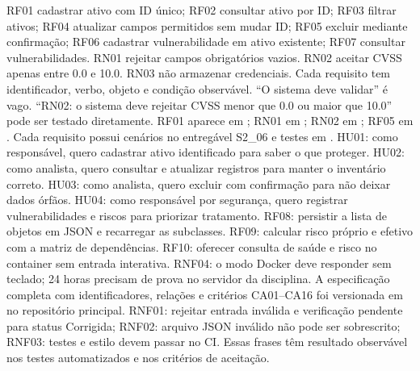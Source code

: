 
 RF01 cadastrar ativo com ID único; RF02 consultar ativo por ID; RF03 filtrar ativos; RF04 atualizar campos permitidos sem mudar ID; RF05 excluir mediante confirmação; RF06 cadastrar vulnerabilidade em ativo existente; RF07 consultar vulnerabilidades. RN01 rejeitar campos obrigatórios vazios. RN02 aceitar CVSS apenas entre 0.0 e 10.0. RN03 não armazenar credenciais.
 Cada requisito tem identificador, verbo, objeto e condição observável. ``O sistema deve validar'' é vago. ``RN02: o sistema deve rejeitar CVSS menor que 0.0 ou maior que 10.0'' pode ser testado diretamente.
 RF01 aparece em ; RN01 em ; RN02 em ; RF05 em . Cada requisito possui cenários no entregável S2\_06 e testes em .
 HU01: como responsável, quero cadastrar ativo identificado para saber o que proteger. HU02: como analista, quero consultar e atualizar registros para manter o inventário correto. HU03: como analista, quero excluir com confirmação para não deixar dados órfãos. HU04: como responsável por segurança, quero registrar vulnerabilidades e riscos para priorizar tratamento.
 RF08: persistir a lista de objetos em JSON e recarregar as subclasses. RF09: calcular risco próprio e efetivo com a matriz de dependências. RF10: oferecer consulta de saúde e risco no container sem entrada interativa. RNF04: o modo Docker deve responder sem teclado; 24 horas precisam de prova no servidor da disciplina. A especificação completa com identificadores, relações e critérios CA01--CA16 foi versionada em  no repositório principal.
 RNF01: rejeitar entrada inválida e verificação pendente para status Corrigida; RNF02: arquivo JSON inválido não pode ser sobrescrito; RNF03: testes e estilo devem passar no CI. Essas frases têm resultado observável nos testes automatizados e nos critérios de aceitação.

